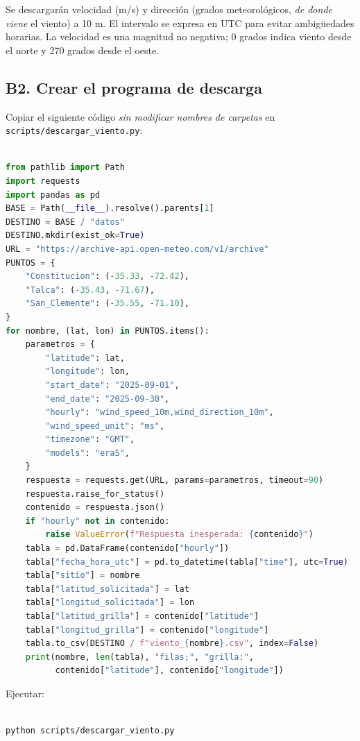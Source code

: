 \documentclass[11pt,a4paper]{article}
\begin{document}
Se descargarán velocidad (m/s) y dirección (grados meteorológicos, \emph{de donde viene} el viento) a 10 m. El intervalo se expresa en UTC para evitar ambigüedades horarias. La velocidad es una magnitud no negativa; 0 grados indica viento desde el norte y 270 grados desde el oeste.

\subsection*{B2. Crear el programa de descarga}

Copiar el siguiente código \emph{sin modificar nombres de carpetas} en \texttt{scripts/descargar\_viento.py}:

\begin{lstlisting}[language=Python]

from pathlib import Path
import requests
import pandas as pd
BASE = Path(__file__).resolve().parents[1]
DESTINO = BASE / "datos"
DESTINO.mkdir(exist_ok=True)
URL = "https://archive-api.open-meteo.com/v1/archive"
PUNTOS = {
    "Constitucion": (-35.33, -72.42),
    "Talca": (-35.43, -71.67),
    "San_Clemente": (-35.55, -71.10),
}
for nombre, (lat, lon) in PUNTOS.items():
    parametros = {
        "latitude": lat,
        "longitude": lon,
        "start_date": "2025-09-01",
        "end_date": "2025-09-30",
        "hourly": "wind_speed_10m,wind_direction_10m",
        "wind_speed_unit": "ms",
        "timezone": "GMT",
        "models": "era5",
    }
    respuesta = requests.get(URL, params=parametros, timeout=90)
    respuesta.raise_for_status()
    contenido = respuesta.json()
    if "hourly" not in contenido:
        raise ValueError(f"Respuesta inesperada: {contenido}")
    tabla = pd.DataFrame(contenido["hourly"])
    tabla["fecha_hora_utc"] = pd.to_datetime(tabla["time"], utc=True)
    tabla["sitio"] = nombre
    tabla["latitud_solicitada"] = lat
    tabla["longitud_solicitada"] = lon
    tabla["latitud_grilla"] = contenido["latitude"]
    tabla["longitud_grilla"] = contenido["longitude"]
    tabla.to_csv(DESTINO / f"viento_{nombre}.csv", index=False)
    print(nombre, len(tabla), "filas;", "grilla:",
          contenido["latitude"], contenido["longitude"])
\end{lstlisting}

Ejecutar:

\begin{lstlisting}

python scripts/descargar_viento.py
\end{lstlisting}
\end{document}
